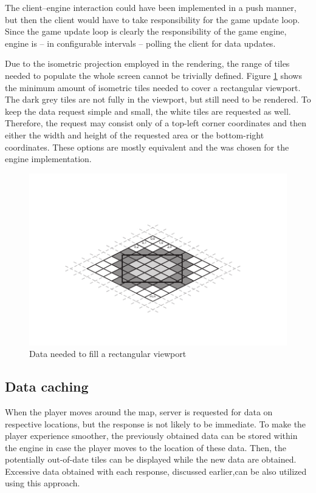 \documentclass[11pt,oneside, final]{fithesis2}
\begin{document}
The client--engine interaction could have been implemented in a push manner, but then the client would have to take responsibility for the game update loop. Since the game update loop is clearly the responsibility of the game engine\cite{gregory}, engine is -- in configurable intervals -- polling the client for data updates.

Due to the isometric projection employed in the rendering, the range of tiles needed to populate the whole screen cannot be trivially defined. Figure \ref{isodata} shows the minimum amount of isometric tiles needed to cover a rectangular viewport. The dark grey tiles are not fully in the viewport, but still need to be rendered. To keep the data request simple and small, the white tiles are requested as well. Therefore, the request may consist only of a top-left corner coordinates and then either the width and height of the requested area or the bottom-right coordinates. These options are mostly equivalent and the was chosen for the engine implementation.

\begin{figure}[h]
	\centering
	\includegraphics[clip=true,trim=20mm 17mm 20mm 23mm]{thesis-isodata}
	\caption{Data needed to fill a rectangular viewport}
	\label{isodata}
\end{figure}

\subsection{Data caching}
When the player moves around the map, server is requested for data on respective locations, but the response is not likely to be immediate. To make the player experience smoother, the previously obtained data can be stored within the engine in case the player moves to the location of these data. Then, the potentially out-of-date tiles can be displayed while the new data are obtained. Excessive data obtained with each response, discussed earlier,can be also utilized using this approach.
\end{document}
